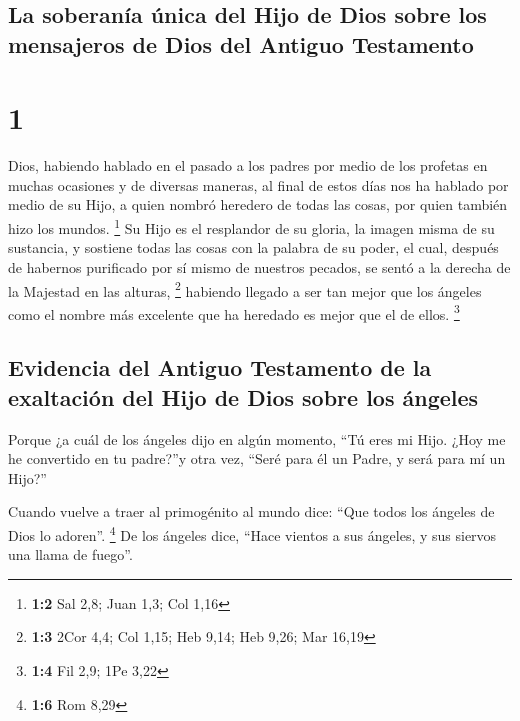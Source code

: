 \hypertarget{la-soberanuxeda-uxfanica-del-hijo-de-dios-sobre-los-mensajeros-de-dios-del-antiguo-testamento}{%
\subsection{La soberanía única del Hijo de Dios sobre los mensajeros de
Dios del Antiguo
Testamento}\label{la-soberanuxeda-uxfanica-del-hijo-de-dios-sobre-los-mensajeros-de-dios-del-antiguo-testamento}}

\hypertarget{section}{%
\section{1}\label{section}}

 Dios, habiendo hablado en el pasado a los padres por
medio de los profetas en muchas ocasiones y de diversas maneras,
 al final de estos días nos ha hablado por medio de su
Hijo, a quien nombró heredero de todas las cosas, por quien también hizo
los mundos. \footnote{\textbf{1:2} Sal 2,8; Juan 1,3; Col 1,16}
 Su Hijo es el resplandor de su gloria, la imagen misma de
su sustancia, y sostiene todas las cosas con la palabra de su poder, el
cual, después de habernos purificado por sí mismo de nuestros pecados,
se sentó a la derecha de la Majestad en las alturas, \footnote{\textbf{1:3}
  2Cor 4,4; Col 1,15; Heb 9,14; Heb 9,26; Mar 16,19} 
habiendo llegado a ser tan mejor que los ángeles como el nombre más
excelente que ha heredado es mejor que el de ellos. \footnote{\textbf{1:4}
  Fil 2,9; 1Pe 3,22}

\hypertarget{evidencia-del-antiguo-testamento-de-la-exaltaciuxf3n-del-hijo-de-dios-sobre-los-uxe1ngeles}{%
\subsection{Evidencia del Antiguo Testamento de la exaltación del Hijo
de Dios sobre los
ángeles}\label{evidencia-del-antiguo-testamento-de-la-exaltaciuxf3n-del-hijo-de-dios-sobre-los-uxe1ngeles}}

 Porque ¿a cuál de los ángeles dijo en algún momento, ``Tú
eres mi Hijo. ¿Hoy me he convertido en tu padre?''y otra vez, ``Seré
para él un Padre, y será para mí un Hijo?''

 Cuando vuelve a traer al primogénito al mundo dice: ``Que
todos los ángeles de Dios lo adoren''. \footnote{\textbf{1:6} Rom 8,29}
 De los ángeles dice, ``Hace vientos a sus ángeles, y sus
siervos una llama de fuego''.


